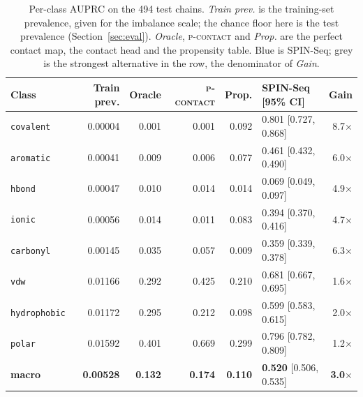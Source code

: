 \documentclass[12pt]{article}
\begin{document}
\begin{table}[tb]
\centering
\caption{Per-class AUPRC on the 494 test chains. \emph{Train prev.} is the training-set
prevalence, given for the imbalance scale; the chance floor here is the test prevalence
(Section~\ref{sec:eval}). \emph{Oracle}, \textsc{p-contact} and \emph{Prop.} are the
perfect contact map, the contact head and the propensity table.
\colorbox{accentfill}{Blue} is SPIN-Seq; \colorbox{contextfill}{grey} is the strongest
alternative in the row, the denominator of \emph{Gain}.}
\label{tab:perclass}
\scriptsize
\renewcommand{\arraystretch}{1.0}
\setlength{\tabcolsep}{4.4pt}
\begin{tabular}{lrrrr>{\columncolor{accentfill}}l>{\columncolor{accentfill}}r}
\toprule
\rowcolor{cabec}
Class & Train prev. & Oracle & \textsc{p-contact} & Prop. & SPIN-Seq \tiny[95\% CI] & Gain \\
\midrule
\texttt{covalent}    & 0.00004 & 0.001 & 0.001 & \cellcolor{contextfill}0.092 & 0.801 \tiny[0.727, 0.868] & 8.7$\times$ \\
\texttt{aromatic}    & 0.00041 & 0.009 & 0.006 & \cellcolor{contextfill}0.077 & 0.461 \tiny[0.432, 0.490] & 6.0$\times$ \\
\texttt{hbond}       & 0.00047 & 0.010 & \cellcolor{contextfill}0.014 & \cellcolor{contextfill}0.014 & 0.069 \tiny[0.049, 0.097] & 4.9$\times$ \\
\texttt{ionic}       & 0.00056 & 0.014 & 0.011 & \cellcolor{contextfill}0.083 & 0.394 \tiny[0.370, 0.416] & 4.7$\times$ \\
\texttt{carbonyl}    & 0.00145 & 0.035 & \cellcolor{contextfill}0.057 & 0.009 & 0.359 \tiny[0.339, 0.378] & 6.3$\times$ \\
\texttt{vdw}         & 0.01166 & 0.292 & \cellcolor{contextfill}0.425 & 0.210 & 0.681 \tiny[0.667, 0.695] & 1.6$\times$ \\
\texttt{hydrophobic} & 0.01172 & \cellcolor{contextfill}0.295 & 0.212 & 0.098 & 0.599 \tiny[0.583, 0.615] & 2.0$\times$ \\
\texttt{polar}       & 0.01592 & 0.401 & \cellcolor{contextfill}0.669 & 0.299 & 0.796 \tiny[0.782, 0.809] & 1.2$\times$ \\
\midrule
\textbf{macro} & \textbf{0.00528} & \textbf{0.132} & \cellcolor{contextfill}\textbf{0.174} & \textbf{0.110} & \textbf{0.520} \tiny[0.506, 0.535] & \textbf{3.0}$\times$ \\
\bottomrule
\end{tabular}
\end{table}
\end{document}
